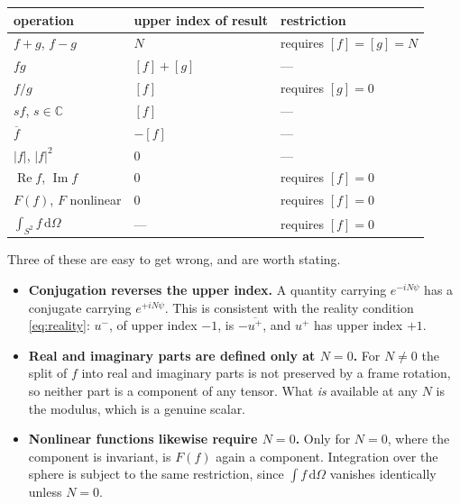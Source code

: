 \documentclass[11pt,a4paper]{article}
\newcommand{\conj}[1]{\overline{#1}}
\newcommand{\dOmega}{\,\mathrm{d}\Omega}
\begin{document}
\begin{center}
\begin{tabular}{lll}
  \toprule
  operation & upper index of result & restriction \\
  \midrule
  $f + g$, $f - g$      & $N$            & requires $[f] = [g] = N$ \\
  $f g$                 & $[f] + [g]$    & --- \\
  $f / g$               & $[f]$          & requires $[g] = 0$ \\
  $s f$, $s \in \mathbb{C}$ & $[f]$      & --- \\
  $\conj{f}$            & $-[f]$         & --- \\
  $|f|$, $|f|^2$        & $0$            & --- \\
  $\operatorname{Re} f$, $\operatorname{Im} f$ & $0$ & requires $[f] = 0$ \\
  $F(f)$, $F$ nonlinear & $0$            & requires $[f] = 0$ \\
  $\int_{S^2} f \dOmega$ & ---           & requires $[f] = 0$ \\
  \bottomrule
\end{tabular}
\end{center}

Three of these are easy to get wrong, and are worth stating.

\begin{itemize}
  \item \textbf{Conjugation reverses the upper index.}  A quantity
    carrying $e^{-iN\psi}$ has a conjugate carrying $e^{+iN\psi}$.  This
    is consistent with the reality condition \eqref{eq:reality}: $u^{-}$,
    of upper index $-1$, is $-\conj{u^{+}}$, and $u^{+}$ has upper index
    $+1$.

  \item \textbf{Real and imaginary parts are defined only at $N = 0$.}
    For $N \neq 0$ the split of $f$ into real and imaginary parts is not
    preserved by a frame rotation, so neither part is a component of any
    tensor.  What \emph{is} available at any $N$ is the modulus, which is
    a genuine scalar.

  \item \textbf{Nonlinear functions likewise require $N = 0$.}  Only for
    $N=0$, where the component is invariant, is $F(f)$ again a
    component.  Integration over the sphere is subject to the same
    restriction, since $\int f \dOmega$ vanishes identically unless
    $N = 0$.
\end{itemize}
\end{document}
